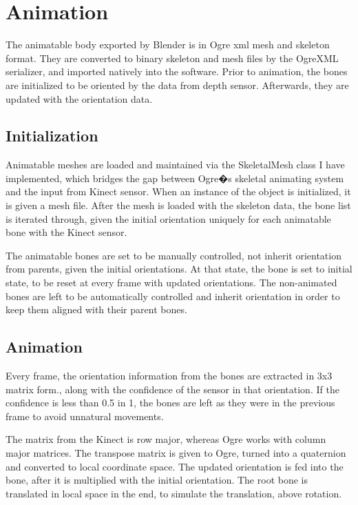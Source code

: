\chapter{Animation}
\label{chapter2}

The animatable body exported by Blender is in Ogre xml mesh and skeleton format. They are converted to binary skeleton and mesh files by the OgreXML serializer, and imported natively into the software. Prior to animation, the bones are initialized to be oriented by the data from depth sensor. Afterwards, they are updated with the orientation data.

\section{Initialization}
\label{section2_1}

Animatable meshes are loaded and maintained via the SkeletalMesh class I have implemented, which bridges the gap between Ogre�s skeletal animating system and the input from Kinect sensor. When an instance of the object is initialized, it is given a mesh file. After the mesh is loaded with the skeleton data, the bone list is iterated through, given the initial orientation uniquely for each animatable bone with the Kinect sensor. 

The animatable bones are set to be manually controlled, not inherit orientation from parents, given the initial orientations. At that state, the bone is set to initial state, to be reset at every frame with updated orientations. The non-animated bones are left to be automatically controlled and inherit orientation in order to keep them aligned with their parent bones. 

\section{Animation}
\label{section2_2}
Every frame, the orientation information from the bones are extracted in 3x3 matrix form., along with the confidence of the sensor in that orientation. If the confidence is less than 0.5 in 1, the bones are left as they were in the previous frame to avoid unnatural movements. 

The matrix from the Kinect is row major, whereas Ogre works with column major matrices. The transpose matrix is given to Ogre, turned into a quaternion and converted to local coordinate space. The updated orientation is fed into the bone, after it is multiplied with the initial orientation. The root bone is translated in local space in the end, to simulate the translation, above rotation.

